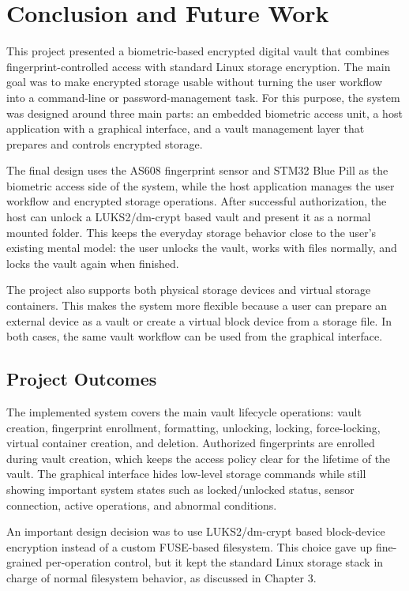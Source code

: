 \chapter{Conclusion and Future Work}

This project presented a biometric-based encrypted digital vault that combines fingerprint-controlled access with standard Linux storage encryption. The main goal was to make encrypted storage usable without turning the user workflow into a command-line or password-management task. For this purpose, the system was designed around three main parts: an embedded biometric access unit, a host application with a graphical interface, and a vault management layer that prepares and controls encrypted storage.

The final design uses the AS608 fingerprint sensor and STM32 Blue Pill as the biometric access side of the system, while the host application manages the user workflow and encrypted storage operations. After successful authorization, the host can unlock a LUKS2/dm-crypt based vault and present it as a normal mounted folder. This keeps the everyday storage behavior close to the user's existing mental model: the user unlocks the vault, works with files normally, and locks the vault again when finished.

The project also supports both physical storage devices and virtual storage containers. This makes the system more flexible because a user can prepare an external device as a vault or create a virtual block device from a storage file. In both cases, the same vault workflow can be used from the graphical interface.

\section{Project Outcomes}

The implemented system covers the main vault lifecycle operations: vault creation, fingerprint enrollment, formatting, unlocking, locking, force-locking, virtual container creation, and deletion. Authorized fingerprints are enrolled during vault creation, which keeps the access policy clear for the lifetime of the vault. The graphical interface hides low-level storage commands while still showing important system states such as locked/unlocked status, sensor connection, active operations, and abnormal conditions.

An important design decision was to use LUKS2/dm-crypt based block-device encryption instead of a custom FUSE-based filesystem. This choice gave up fine-grained per-operation control, but it kept the standard Linux storage stack in charge of normal filesystem behavior, as discussed in Chapter 3.

